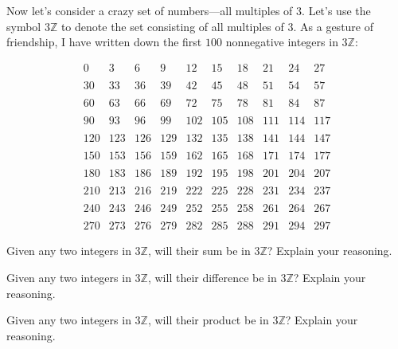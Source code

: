 \documentclass[nooutcomes]{ximera}
\begin{document}
Now let's consider a crazy set of numbers---all multiples of
$3$. Let's use the symbol $3\mathbb{Z}$ to denote the set consisting of all
multiples of $3$. As a gesture of friendship, I have written down the
first $100$ nonnegative integers in $3\mathbb{Z}$:


\[
\begin{array}{cccccccccc}
0   & 3   & 6   & 9   & 12  & 15  & 18  & 21  & 24  & 27  \\
\\
30  & 33  & 36  & 39  & 42  & 45  & 48  & 51  & 54  & 57  \\
\\
60  & 63  & 66  & 69  & 72  & 75  & 78  & 81  & 84  & 87  \\
\\
90  & 93  & 96  & 99  & 102 & 105 & 108 & 111 & 114 & 117 \\
\\
120 & 123 & 126 & 129 & 132 & 135 & 138 & 141 & 144 & 147 \\
\\
150 & 153 & 156 & 159 & 162 & 165 & 168 & 171 & 174 & 177 \\
\\
180 & 183 & 186 & 189 & 192 & 195 & 198 & 201 & 204 & 207 \\
\\
210 & 213 & 216 & 219 & 222 & 225 & 228 & 231 & 234 & 237 \\
\\
240 & 243 & 246 & 249 & 252 & 255 & 258 & 261 & 264 & 267 \\
\\
270 & 273 & 276 & 279 & 282 & 285 & 288 & 291 & 294 & 297
\end{array}
\]



\begin{question}
Given any two integers in $3\mathbb{Z}$, will their sum be in $3\mathbb{Z}$? Explain
your reasoning.
\end{question}

\begin{question}
Given any two integers in $3\mathbb{Z}$, will their difference be in $3\mathbb{Z}$?
Explain your reasoning.
\end{question}

\begin{question}
Given any two integers in $3\mathbb{Z}$, will their product be in $3\mathbb{Z}$?
Explain your reasoning.
\end{question}
\end{document}
